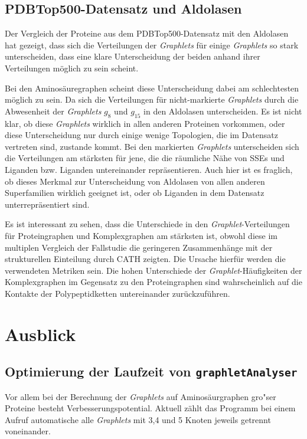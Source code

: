 \documentclass{report}
\begin{document}
\subsection{PDBTop500-Datensatz und Aldolasen}

Der Vergleich der Proteine aus dem PDBTop500-Datensatz mit den Aldolasen hat gezeigt, dass sich die Verteilungen der \textit{Graphlets} f\"ur einige \textit{Graphlets} so stark unterscheiden, dass eine klare Unterscheidung der beiden anhand ihrer Verteilungen m\"oglich zu sein scheint.

Bei den Aminos\"auregraphen scheint diese Unterscheidung dabei am schlechtesten m\"oglich zu sein. Da sich die Verteilungen f\"ur nicht-markierte \textit{Graphlets} durch die Abwesenheit der \textit{Graphlets} $g_8$ und $g_{15}$ in den Aldolasen unterscheiden. Es ist nicht klar, ob diese \textit{Graphlets} wirklich in allen anderen Proteinen vorkommen, oder diese Unterscheidung nur durch einige wenige Topologien, die im Datensatz vertreten sind, zustande kommt.
Bei den markierten \textit{Graphlets} unterscheiden sich die Verteilungen am st\"arksten f\"ur jene, die die r\"aumliche N\"ahe von SSEs und Liganden bzw. Liganden untereinander repr\"asentieren.
Auch hier ist es fraglich, ob dieses Merkmal zur Unterscheidung von Aldolasen von allen anderen Superfamilien wirklich geeignet ist, oder ob Liganden in dem Datensatz unterrepr\"asentiert sind. 

Es ist interessant zu sehen, dass die Unterschiede in den \textit{Graphlet}-Verteilungen f\"ur Proteingraphen und Komplexgraphen am st\"arksten ist, obwohl diese im multiplen Vergleich der Fallstudie die geringeren Zusammenh\"ange mit der strukturellen Einteilung durch CATH zeigten. Die Ursache hierf\"ur werden die verwendeten Metriken sein. Die hohen Unterschiede der \textit{Graphlet}-H\"aufigkeiten der Komplexgraphen im Gegensatz zu den Proteingraphen sind wahrscheinlich auf die Kontakte der Polypeptidketten untereinander zur\"uckzuf\"uhren.
 


\section{Ausblick}


\subsection{Optimierung der Laufzeit von \texttt{graphletAnalyser}}

Vor allem bei der Berechnung der \textit{Graphlets} auf Aminos\"aurgraphen gro"ser Proteine besteht Verbesserungspotential. Aktuell z\"ahlt das Programm bei einem Aufruf automatische alle \textit{Graphlets} mit 3,4 und 5 Knoten jeweils getrennt voneinander.
\end{document}
